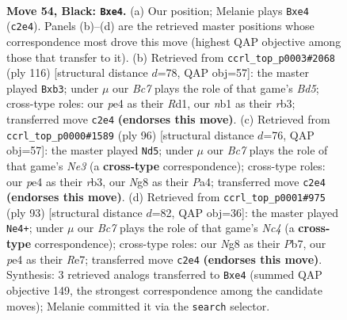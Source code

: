 \documentclass[11pt]{article}
\begin{document}
\clearpage

\begin{figure}[p]\centering
\begin{subfigure}{0.46\textwidth}\centering
\resizebox{\linewidth}{!}{%
\newchessgame
\chessboard[
  setfen={5bn1/p6k/P6p/1p3p2/1P2PP1K/8/1Rb5/RNr5 b - - 0 54},
  showmover=false,
  pgfstyle=straightmove, color=movearrow, markmove={c2-e4}
]}
\caption{}
\end{subfigure}\hfill
\begin{subfigure}{0.46\textwidth}\centering
\resizebox{\linewidth}{!}{%
\newchessgame
\chessboard[
  setfen={8/5pk1/6p1/1nrB4/4P1P1/1r2PK2/3p4/3R4 w - - 0 59},
  showmover=false,
  pgfstyle=straightmove, color=movearrow, markmove={d5-b3}
]}
\caption{}
\end{subfigure}
\\[4pt]
\begin{subfigure}{0.46\textwidth}\centering
\resizebox{\linewidth}{!}{%
\newchessgame
\chessboard[
  setfen={8/5k2/p3rn2/5R1p/P1p2P1P/1rP1N1P1/5K2/2B5 w - - 5 49},
  showmover=false,
  pgfstyle=straightmove, color=movearrow, markmove={e3-d5}
]}
\caption{}
\end{subfigure}\hfill
\begin{subfigure}{0.46\textwidth}\centering
\resizebox{\linewidth}{!}{%
\newchessgame
\chessboard[
  setfen={1k6/1p2r3/6p1/r1n2p2/PR1P3p/7P/3KN1P1/1R6 b - - 5 47},
  showmover=false,
  pgfstyle=straightmove, color=movearrow, markmove={c5-e4}
]}
\caption{}
\end{subfigure}
\caption{\textbf{Move 54, Black: \texttt{Bxe4}.} (a) Our position; Melanie plays \texttt{Bxe4} (\texttt{c2e4}). Panels (b)--(d) are the retrieved master positions whose correspondence most drove this move (highest QAP objective among those that transfer to it). (b) Retrieved from \texttt{ccrl\_top\_p0003\#2068} (ply 116) [structural distance $d$=78, QAP obj=57]: the master played \texttt{Bxb3}; under $\mu$ our \emph{Bc7} plays the role of that game's \emph{Bd5}; cross-type roles: our \emph{p}e4 as their \emph{R}d1, our \emph{n}b1 as their \emph{r}b3; transferred move \texttt{c2e4} \textbf{(endorses this move)}. (c) Retrieved from \texttt{ccrl\_top\_p0000\#1589} (ply 96) [structural distance $d$=76, QAP obj=57]: the master played \texttt{Nd5}; under $\mu$ our \emph{Bc7} plays the role of that game's \emph{Ne3} (a \textbf{cross-type} correspondence); cross-type roles: our \emph{p}e4 as their \emph{r}b3, our \emph{N}g8 as their \emph{P}a4; transferred move \texttt{c2e4} \textbf{(endorses this move)}. (d) Retrieved from \texttt{ccrl\_top\_p0001\#975} (ply 93) [structural distance $d$=82, QAP obj=36]: the master played \texttt{Ne4+}; under $\mu$ our \emph{Bc7} plays the role of that game's \emph{Nc4} (a \textbf{cross-type} correspondence); cross-type roles: our \emph{N}g8 as their \emph{P}b7, our \emph{p}e4 as their \emph{R}e7; transferred move \texttt{c2e4} \textbf{(endorses this move)}. Synthesis: 3 retrieved analogs transferred to \texttt{Bxe4} (summed QAP objective 149, the strongest correspondence among the candidate moves); Melanie committed it via the \texttt{search} selector.}
\label{fig:thought-m107}
\end{figure}
\end{document}
